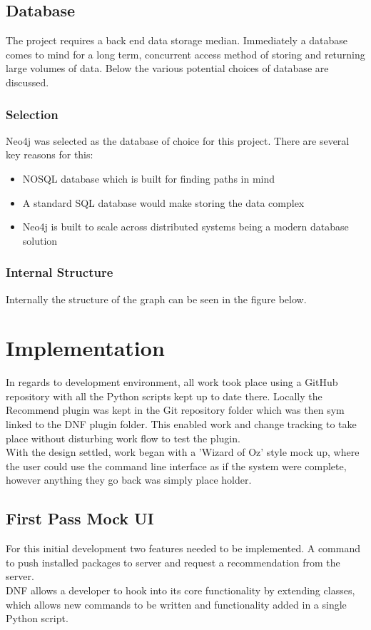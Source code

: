 \documentclass{l4proj}
\begin{document}
\section{Database}
The project requires a back end data storage median. Immediately a database comes to mind for a long term, concurrent access method of storing and returning large volumes of data. Below the various potential choices of database are discussed.

\subsection{Selection}
Neo4j was selected as the database of choice for this project. There are several key reasons for this:
\begin{itemize}
\item NOSQL database which is built for finding paths in mind
\item A standard SQL database would make storing the data complex
\item Neo4j is built to scale across distributed systems being a modern database solution
\end{itemize}

\subsection{Internal Structure}
Internally the structure of the graph can be seen in the figure below.

 
 
\chapter{Implementation}
In regards to development environment, all work took place using a GitHub repository with all the Python scripts kept up to date there. Locally the Recommend plugin was kept in the Git repository folder which was then sym linked to the DNF plugin folder. This enabled work and change tracking to take place without disturbing work flow to test the plugin.\\
With the design settled, work began with a 'Wizard of Oz' style mock up, where the user could use the command line interface as if the system were complete, however anything they go back was simply place holder.

\section{First Pass Mock UI}
For this initial development two features needed to be implemented. A command to push installed packages to server and request a recommendation from the server.\\
DNF allows a developer to hook into its core functionality by extending classes, which allows new commands to be written and functionality added in a single Python script.
\end{document}
